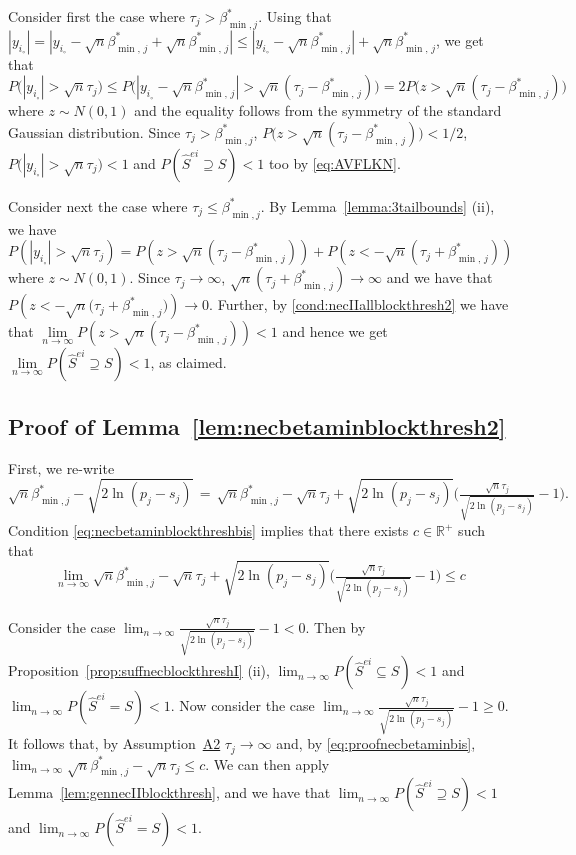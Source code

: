 \documentclass[
  12pt]{article}
\newcommand{\R}{\mathbb{R}}
\begin{document}
Consider first the case where $\tau_j>\beta_{\min,j}^*$. Using that $|y_{i_{\circ}}|=|y_{i_{\circ}}-\sqrt{n}\beta^*_{\min,\,j}+\sqrt{n}\beta^*_{\min,\,j}|\leq  |y_{i_{\circ}}-\sqrt{n}\beta^*_{\min,\,j}| + \sqrt{n}\beta^*_{\min,\,j}$, we get that 
$$P\big(|y_{i_{\circ}}| > \sqrt{n}\tau_j\big)\leq P\big(|y_{i_{\circ}}-\sqrt{n}\beta^*_{\min,\,j}|>\sqrt{n}(\tau_j-\beta^*_{\min,\,j})\big) = 2P\big(z>\sqrt{n}(\tau_j-\beta^*_{\min,\,j})\big)$$
where $z\sim N(0,1)$ and the equality follows from the symmetry of the standard Gaussian distribution. Since $\tau_j>\beta_{\min,j}^*$, $P\big(z>\sqrt{n}(\tau_j-\beta^*_{\min,\,j})\big)<1/2$, $P\big(|y_{i_{\circ}}| > \sqrt{n}\tau_j\big)<1$ and $P(\hat{S}^{ei}\supseteq S)<1$ too by \eqref{eq:AVFLKN}.


Consider next the case where $\tau_j\leq\beta_{\min,j}^*$. By Lemma~\ref{lemma:3tailbounds} (ii), we have
$$P(|y_{i_{\circ}}|>\sqrt{n}\tau_j) 
    = P\left(z>\sqrt{n}\left(\tau_j-\beta_{\min,\,j}^*\right)\right) + P\left(z<-\sqrt{n}\left(\tau_j+\beta_{\min,\,j}^*\right)\right)$$ where $z\sim N(0,1)$. Since $\tau_j\to\infty$, $\sqrt{n}\left(\tau_j+\beta_{\min,\,j}^*\right)\to\infty$ and we have that $P(z<-\sqrt{n}\big(\tau_j+\beta_{\min,\,j}^*\big)) \to 0$. Further, by \eqref{cond:necIIallblockthresh2}  we have that $\underset{n \to \infty}{\lim}P\left(z>\sqrt{n}\left(\tau_j-\beta_{\min,\,j}^*\right)\right)<1$ and hence we get $\underset{n \to \infty}{\lim}P(\hat{S}^{ei} \supseteq S )<1$, as claimed.

\subsection{Proof of Lemma~\ref{lem:necbetaminblockthresh2}}
 First, we re-write 
 $$\sqrt{n}\beta_{\min,j}^*-\sqrt{2\ln(p_j-s_j)} \,=\, \sqrt{n}\beta_{\min,j}^*-\sqrt{n}\tau_j+\sqrt{2\ln(p_j-s_j)}\Big(\tfrac{\sqrt{n}\tau_j}{\sqrt{2\ln(p_j-s_j)}}-1\Big).$$ 
 Condition \eqref{eq:necbetaminblockthreshbis} implies that there exists $c\in\R^+$ such that
  \begin{equation}\label{eq:proofnecbetaminbis}
      \lim_{n\to \infty}\sqrt{n}\beta_{\min,j}^*-\sqrt{n}\tau_j+\sqrt{2\ln(p_j-s_j)}\Big(\tfrac{\sqrt{n}\tau_j}{\sqrt{2\ln(p_j-s_j)}}-1\Big)\leq c
  \end{equation}

Consider the case $\lim_{n\to \infty}\tfrac{\sqrt{n}\tau_j}{\sqrt{2\ln(p_j-s_j)}}-1<0$. Then by Proposition~\ref{prop:suffnecblockthreshI} (ii),
$\lim_{n\to \infty}P(\hat{S}^{ei} \subseteq S)< 1$ and $\lim_{n\to \infty}P(\hat{S}^{ei} = S)< 1$.  Now consider the case $\lim_{n\to \infty}\tfrac{\sqrt{n}\tau_j}{\sqrt{2\ln(p_j-s_j)}}-1 \geq0$. It follows that, by Assumption~\hyperlink{lab:A2}{A2} $\tau_j\to\infty$ and, by \eqref{eq:proofnecbetaminbis}, $\lim_{n\to \infty}\sqrt{n}\beta_{\min,j}^*-\sqrt{n}\tau_j \leq c$. We can then apply Lemma~\ref{lem:gennecIIblockthresh}, and we have that $\lim_{n\to \infty}P(\hat{S}^{ei} \supseteq S)< 1$ and $\lim_{n\to \infty}P(\hat{S}^{ei} = S)< 1$.
\end{document}
